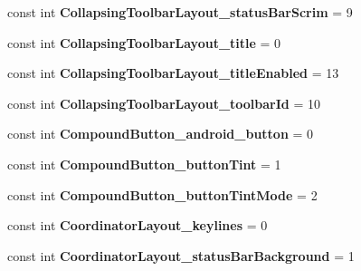 \begin{DoxyCompactItemize}
const int {\bfseries Collapsing\+Toolbar\+Layout\+\_\+status\+Bar\+Scrim} = 9
\item 
\mbox{\label{class_sample_app_1_1_droid_1_1_resource_1_1_styleable_a82cef15a0005a3426295e85b8030e8fb}} 
const int {\bfseries Collapsing\+Toolbar\+Layout\+\_\+title} = 0
\item 
\mbox{\label{class_sample_app_1_1_droid_1_1_resource_1_1_styleable_a788bdbf45277f8e1b2be0dd6c1d51756}} 
const int {\bfseries Collapsing\+Toolbar\+Layout\+\_\+title\+Enabled} = 13
\item 
\mbox{\label{class_sample_app_1_1_droid_1_1_resource_1_1_styleable_a47262fa23561e32c17279595e5da2646}} 
const int {\bfseries Collapsing\+Toolbar\+Layout\+\_\+toolbar\+Id} = 10
\item 
\mbox{\label{class_sample_app_1_1_droid_1_1_resource_1_1_styleable_ad5965052b7a9dc6d420674c893bc95c7}} 
const int {\bfseries Compound\+Button\+\_\+android\+\_\+button} = 0
\item 
\mbox{\label{class_sample_app_1_1_droid_1_1_resource_1_1_styleable_a2cc01157d316382c67163318ae662494}} 
const int {\bfseries Compound\+Button\+\_\+button\+Tint} = 1
\item 
\mbox{\label{class_sample_app_1_1_droid_1_1_resource_1_1_styleable_a6e9615643b657f9900a489835ccc16d9}} 
const int {\bfseries Compound\+Button\+\_\+button\+Tint\+Mode} = 2
\item 
\mbox{\label{class_sample_app_1_1_droid_1_1_resource_1_1_styleable_a03f35237883f250491e676776bb35a26}} 
const int {\bfseries Coordinator\+Layout\+\_\+keylines} = 0
\item 
\mbox{\label{class_sample_app_1_1_droid_1_1_resource_1_1_styleable_a1f96c5a024afe904acf13c25f610e5cf}} 
const int {\bfseries Coordinator\+Layout\+\_\+status\+Bar\+Background} = 1

\end{DoxyCompactItemize}
